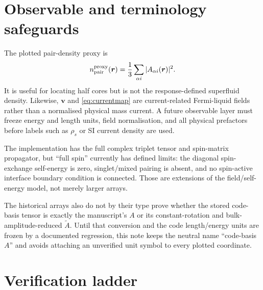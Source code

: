 \documentclass[11pt,a4paper]{article}
\begin{document}
\section{Observable and terminology safeguards}

The plotted pair-density proxy is
\begin{equation}
  n_{\rm pair}^{\rm proxy}(\bm r)=
  \frac13\sum_{\alpha i}|A_{\alpha i}(\bm r)|^2.
  \label{eq:pairdensity}
\end{equation}
It is useful for locating half cores but is not the response-defined
superfluid density.  Likewise, $\bm v$ and \eqref{eq:currentmap} are
current-related Fermi-liquid fields rather than a normalised physical mass
current.  A future observable layer must freeze energy and length units, field
normalisation, and all physical prefactors before labels such as
$\rho_s$ or SI current density are used.

The implementation has the full complex triplet tensor and spin-matrix
propagator, but ``full spin'' currently has defined limits: the diagonal
spin-exchange self-energy is zero, singlet/mixed pairing is absent, and no
spin-active interface boundary condition is connected.  Those are extensions
of the field/self-energy model, not merely larger arrays.

The historical arrays also do not by their type prove whether the stored
code-basis tensor is exactly the manuscript's $A$ or its constant-rotation and
bulk-amplitude-reduced $\widetilde A$.  Until that conversion and the code
length/energy units are frozen by a documented regression, this note keeps the
neutral name ``code-basis $A$'' and avoids attaching an unverified unit symbol
to every plotted coordinate.

\section{Verification ladder}
\end{document}
